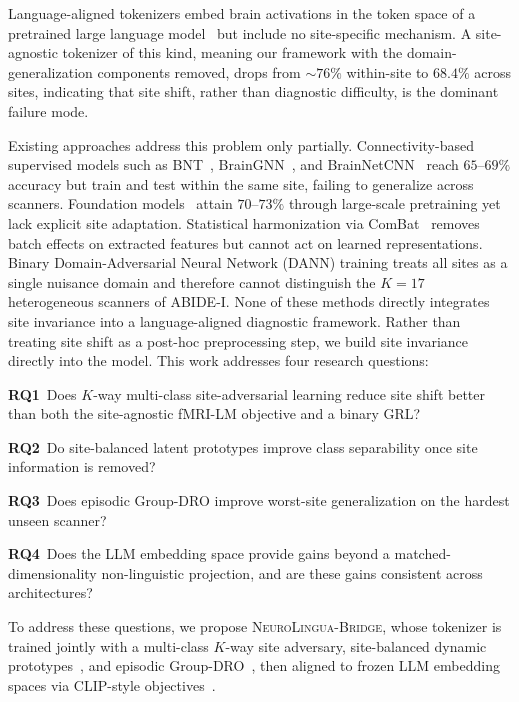 \documentclass[runningheads]{llncs}
\newcommand{\method}{\textsc{NeuroLingua-Bridge}}
\begin{document}
Language-aligned tokenizers embed brain activations in the token space of a pretrained large language model~\cite{wei2026fmrilm} but include no site-specific mechanism. A site-agnostic tokenizer of this kind, meaning our framework with the domain-generalization components removed, drops from ${\sim}76\%$ within-site to $68.4\%$ across sites, indicating that site shift, rather than diagnostic difficulty, is the dominant failure mode.

Existing approaches address this problem only partially. Connectivity-based supervised models such as BNT~\cite{kan2022bnt}, BrainGNN~\cite{li2021braingnn}, and 
BrainNetCNN~\cite{kawahara2017brainnetcnn} reach $65$--$69\%$ accuracy but train and 
test within the same site, failing to generalize across scanners. Foundation 
models~\cite{caro2024brainlm,dong2024brainjepa} attain $70$--$73\%$ through large-scale pretraining yet lack explicit site adaptation. Statistical harmonization via ComBat~\cite{fortin2018combat} removes batch effects on extracted features but cannot act on learned representations. Binary Domain-Adversarial Neural Network (DANN) training treats all sites as a single nuisance domain and therefore cannot distinguish the $K{=}17$ heterogeneous scanners of ABIDE-I. None of these methods directly integrates site invariance into a language-aligned diagnostic framework. Rather than treating site shift as a post-hoc preprocessing step, we build site invariance directly into the model. This work addresses four research questions:

\textbf{RQ1}~Does $K$-way multi-class site-adversarial learning reduce site shift better than both the site-agnostic fMRI-LM objective and a binary GRL?

\textbf{RQ2}~Do site-balanced latent prototypes improve class separability once site information is removed? 

\textbf{RQ3}~Does episodic Group-DRO improve worst-site generalization on the hardest unseen scanner? 

\textbf{RQ4}~Does the LLM embedding space provide gains beyond a matched-dimensionality non-linguistic projection, and are these gains consistent across architectures?

To address these questions, we propose \method{}, whose tokenizer is trained jointly with a multi-class $K$-way site 
adversary, site-balanced dynamic prototypes~\cite{vandenoord2017vqvae}, and episodic Group-DRO~\cite{sagawa2020groupdro}, then aligned to frozen LLM embedding spaces via CLIP-style objectives~\cite{radford2021clip}.
\end{document}
